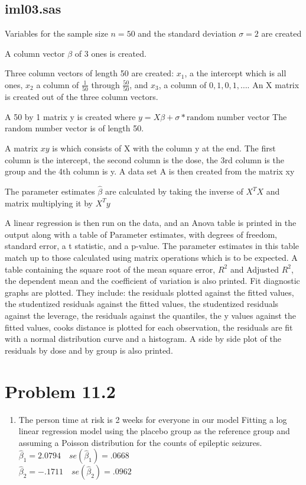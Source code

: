 \documentclass{article}
\newcommand{\B}{\beta}
\newcommand{\hb}{\hat{\beta}}
\begin{document}
\begin{flushleft}
\subsection*{iml03.sas}
Variables for the sample size $n=50$ and the standard deviation $\sigma=2$ are created\medbreak

A column vector $\B$ of 3 ones is created.

Three column vectors of length 50 are created: $x_1$, a the intercept which is all ones, $x_2$ a column of $\frac{1}{50}$ through $\frac{50}{50}$, and $x_3$, a column of $0,1,0,1,\dots$.
An X matrix is created out of the three column vectors.

A 50 by 1 matrix y is created where $y=X\B+\sigma*\text{random number vector}$ The random number vector is of length 50. \medbreak

A matrix $xy$ is which consists of X with the column y at the end. The first column is the intercept, the second column is the dose, the 3rd column is the group and the 4th column is y. A data set A is then created from the matrix xy \medbreak

The parameter estimates $\hb$ are calculated by taking the inverse of $X^{T}X$ and matrix multiplying it by $X^{T}y$ \medbreak

A linear regression is then run on the data, and an Anova table is printed in the output along with a table of Parameter estimates, with degrees of freedom, standard error, a t statistic, and a p-value. The parameter estimates in this table match up to those calculated using matrix operations which is to be expected. A table containing the square root of the mean square error, $R^2$ and Adjusted $R^2$, the dependent mean and the coefficient of variation is also printed. \medbreak
Fit diagnostic graphs are plotted. They include: the residuals plotted against the fitted values, the studentized residuals against the fitted values, the studentized residuals against the leverage, the residuals against the quantiles, the y values against the fitted values, cooks distance is plotted for each observation, the residuals are fit with a normal distribution curve and a histogram. A side by side plot of the residuals by dose and by group is also printed. \medbreak

\section*{Problem 11.2}
\begin{enumerate}
\item
The person time at risk is 2 weeks for everyone in our model \medbreak
Fitting a log linear regression model using the placebo group as the reference group and assuming a Poisson distribution for the counts of epileptic seizures.\medbreak
 $\hb_1=2.0794 \quad se(\hb_1)=.0668$\\
 $\hb_2=-.1711 \quad se(\hb_2)=.0962$ \medbreak
 

\end{enumerate}
\end{flushleft}
\end{document}
